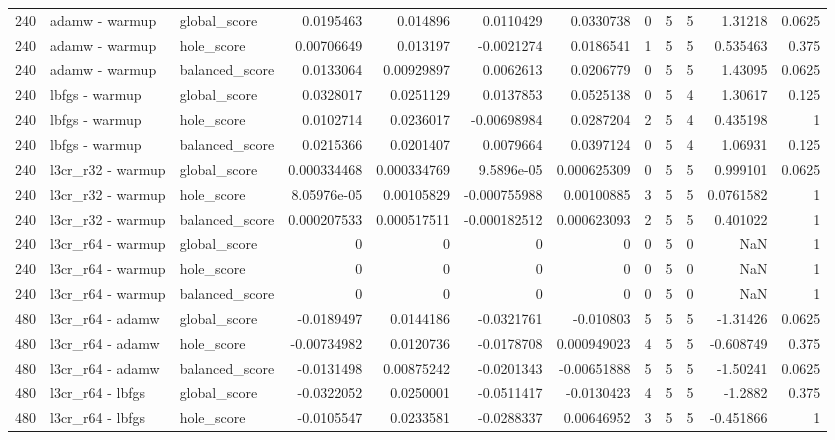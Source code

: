 \begin{tabular}{rllrrrrrrrrr}
240 & adamw - warmup & global_score & 0.0195463 & 0.014896 & 0.0110429 & 0.0330738 & 0 & 5 & 5 & 1.31218 & 0.0625 \\
240 & adamw - warmup & hole_score & 0.00706649 & 0.013197 & -0.0021274 & 0.0186541 & 1 & 5 & 5 & 0.535463 & 0.375 \\
240 & adamw - warmup & balanced_score & 0.0133064 & 0.00929897 & 0.0062613 & 0.0206779 & 0 & 5 & 5 & 1.43095 & 0.0625 \\
240 & lbfgs - warmup & global_score & 0.0328017 & 0.0251129 & 0.0137853 & 0.0525138 & 0 & 5 & 4 & 1.30617 & 0.125 \\
240 & lbfgs - warmup & hole_score & 0.0102714 & 0.0236017 & -0.00698984 & 0.0287204 & 2 & 5 & 4 & 0.435198 & 1 \\
240 & lbfgs - warmup & balanced_score & 0.0215366 & 0.0201407 & 0.0079664 & 0.0397124 & 0 & 5 & 4 & 1.06931 & 0.125 \\
240 & l3cr_r32 - warmup & global_score & 0.000334468 & 0.000334769 & 9.5896e-05 & 0.000625309 & 0 & 5 & 5 & 0.999101 & 0.0625 \\
240 & l3cr_r32 - warmup & hole_score & 8.05976e-05 & 0.00105829 & -0.000755988 & 0.00100885 & 3 & 5 & 5 & 0.0761582 & 1 \\
240 & l3cr_r32 - warmup & balanced_score & 0.000207533 & 0.000517511 & -0.000182512 & 0.000623093 & 2 & 5 & 5 & 0.401022 & 1 \\
240 & l3cr_r64 - warmup & global_score & 0 & 0 & 0 & 0 & 0 & 5 & 0 & NaN & 1 \\
240 & l3cr_r64 - warmup & hole_score & 0 & 0 & 0 & 0 & 0 & 5 & 0 & NaN & 1 \\
240 & l3cr_r64 - warmup & balanced_score & 0 & 0 & 0 & 0 & 0 & 5 & 0 & NaN & 1 \\
480 & l3cr_r64 - adamw & global_score & -0.0189497 & 0.0144186 & -0.0321761 & -0.010803 & 5 & 5 & 5 & -1.31426 & 0.0625 \\
480 & l3cr_r64 - adamw & hole_score & -0.00734982 & 0.0120736 & -0.0178708 & 0.000949023 & 4 & 5 & 5 & -0.608749 & 0.375 \\
480 & l3cr_r64 - adamw & balanced_score & -0.0131498 & 0.00875242 & -0.0201343 & -0.00651888 & 5 & 5 & 5 & -1.50241 & 0.0625 \\
480 & l3cr_r64 - lbfgs & global_score & -0.0322052 & 0.0250001 & -0.0511417 & -0.0130423 & 4 & 5 & 5 & -1.2882 & 0.375 \\
480 & l3cr_r64 - lbfgs & hole_score & -0.0105547 & 0.0233581 & -0.0288337 & 0.00646952 & 3 & 5 & 5 & -0.451866 & 1 \\

\end{tabular}
